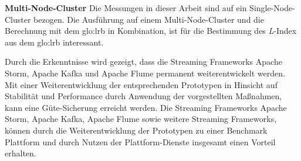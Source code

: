 \textbf{Multi-Node-Cluster}
Die Messungen in dieser Arbeit sind auf ein Single-Node-Cluster bezogen. Die Ausführung auf einem Multi-Node-Cluster und die Berechnung mit dem \gls{glo:lrb} in Kombination, ist für die Bestimmung des \textit{L}-Index aus dem \gls{glo:lrb} interessant.

Durch die Erkenntnisse wird gezeigt, dass die Streaming Frameworks Apache Storm, Apache Kafka und Apache Flume permanent weiterentwickelt werden. Mit einer Weiterentwicklung der entsprechenden Prototypen in Hinsicht auf Stabilität und Performance durch Anwendung der vorgestellten Maßnahmen, kann eine Güte-Sicherung erreicht werden. Die Streaming Frameworks Apache Storm, Apache Kafka, Apache Flume sowie weitere Streaming Frameworks, können durch die Weiterentwicklung der Prototypen zu einer Benchmark Plattform und durch Nutzen der Plattform-Dienste insgesamt einen Vorteil erhalten.

